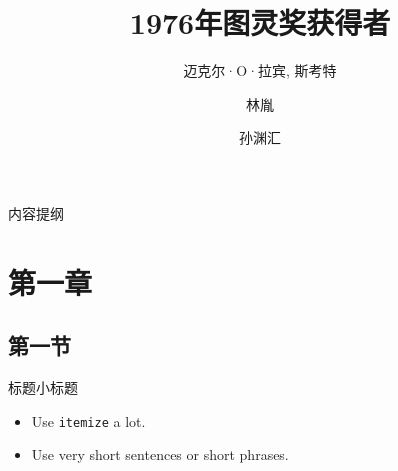 \documentclass{beamer}
\title[图灵奖获得者] %
{1976年图灵奖获得者}
\subtitle
{迈克尔·O·拉宾, 斯考特}
\author[林胤, 孙渊汇] %
{林胤\and 孙渊汇}
\institute[同济大学] %
{
  电子与信息学院\\
  同济大学
}
\begin{document}
\begin{frame}
  \titlepage
\end{frame}

\begin{frame}{内容提纲}
  \tableofcontents
\end{frame}





\section{第一章}

\subsection{第一节}

\begin{frame}{标题}{小标题}

  \begin{itemize}
  \item
    Use \texttt{itemize} a lot.
  \item
    Use very short sentences or short phrases.
  \end{itemize}
\end{frame}
\end{document}
